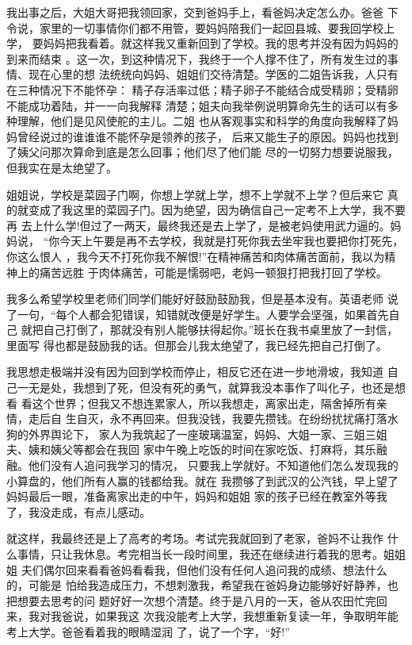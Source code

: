 \documentclass[12pt]{book}
\begin{document}
        我出事之后，大姐大哥把我领回家，交到爸妈手上，看爸妈决定怎么办。爸爸
下令说，家里的一切事情你们都不用管，要妈妈陪我们一起回县城、要我回学校上学，
要妈妈把我看着。就这样我又重新回到了学校。我的思考并没有因为妈妈的到来而结束
。这一次，到这种情况下，我终于一个人撑不住了，所有发生过的事情、现在心里的想
法统统向妈妈、姐姐们交待清楚。学医的二姐告诉我，人只有在三种情况下不能怀孕：
精子存活率过低；精子卵子不能结合成受精卵；受精卵不能成功着陆，并一一向我解释
清楚；姐夫向我举例说明算命先生的话可以有多种理解，他们是见风使舵的主儿。二姐
也从客观事实和科学的角度向我解释了妈妈曾经说过的谁谁谁不能怀孕是领养的孩子，
后来又能生子的原因。妈妈也找到了姨父问那次算命到底是怎么回事；他们尽了他们能
尽的一切努力想要说服我，但我实在是太绝望了。

        姐姐说，学校是菜园子门啊，你想上学就上学，想不上学就不上学？但后来它
真的就变成了我这里的菜园子门。因为绝望，因为确信自己一定考不上大学，我不要再
去上什么学!但过了一两天，最终我还是去上学了，是被老妈使用武力逼的。妈妈说，
“你今天上午要是再不去学校，我就是打死你我去坐牢我也要把你打死先，你这么恨人
，我今天不打死你我不解恨!”在精神痛苦和肉体痛苦面前，我以为精神上的痛苦远胜
于肉体痛苦，可能是懦弱吧，老妈一顿狠打把我打回了学校。

        我多么希望学校里老师们同学们能好好鼓励鼓励我，但是基本没有。英语老师
说了一句，“每个人都会犯错误，知错就改便是好学生。人要学会坚强，如果首先自己
就把自己打倒了，那就没有别人能够扶得起你。”班长在我书桌里放了一封信，里面写
得也都是鼓励我的话。但那会儿我太绝望了，我已经先把自己打倒了。

        我思想走极端并没有因为回到学校而停止，相反它还在进一步地滑坡，我知道
自己一无是处，我想到了死，但没有死的勇气，就算我没本事作了叫化子，也还是想看
看这个世界；但我又不想连累家人，所以我想走，离家出走，隔舍掉所有亲情，走后自
生自灭，永不再回来。但我没钱，我要先攒钱。在纷纷扰扰痛打落水狗的外界舆论下，
家人为我筑起了一座玻璃温室，妈妈、大姐一家、三姐三姐夫、姨和姨父等都会在我回
家中午晚上吃饭的时间在家吃饭、打麻将，其乐融融。他们没有人追问我学习的情况，
只要我上学就好。不知道他们怎么发现我的小算盘的，他们所有人赢的钱都给我。就在
我攒够了到武汉的公汽钱，早上望了妈妈最后一眼，准备离家出走的中午，妈妈和姐姐
家的孩子已经在教室外等我了，我没走成，有点儿感动。

        就这样，我最终还是上了高考的考场。考试完我就回到了老家，爸妈不让我作
什么事情，只让我休息。考完相当长一段时间里，我还在继续进行着我的思考。姐姐姐
夫们偶尔回来看看爸妈看看我，但他们没有任何人追问我的成绩、想法什么的，可能是
怕给我造成压力，不想刺激我，希望我在爸妈身边能够好好静养，也把想要去思考的问
题好好一次想个清楚。终于是八月的一天，爸从农田忙完回来，我对我爸说，如果我这
次我没能考上大学，我想重新复读一年，争取明年能考上大学。爸爸看着我的眼睛湿润
了，说了一个字，“好!”
\end{document}
